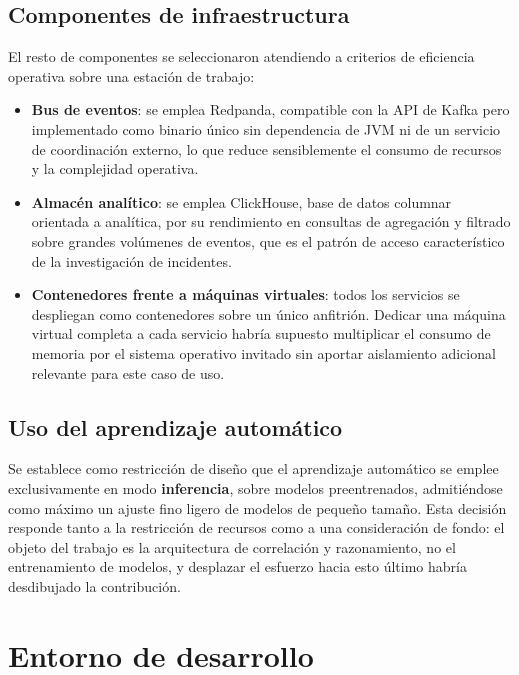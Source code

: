 \subsection{Componentes de infraestructura}

El resto de componentes se seleccionaron atendiendo a criterios de eficiencia operativa
sobre una estación de trabajo:

\begin{itemize}
    \item \textbf{Bus de eventos}: se emplea Redpanda, compatible con la API de Kafka pero
    implementado como binario único sin dependencia de JVM ni de un servicio de coordinación
    externo, lo que reduce sensiblemente el consumo de recursos y la complejidad operativa.
    \item \textbf{Almacén analítico}: se emplea ClickHouse, base de datos columnar orientada
    a analítica, por su rendimiento en consultas de agregación y filtrado sobre grandes
    volúmenes de eventos, que es el patrón de acceso característico de la investigación de
    incidentes.
    \item \textbf{Contenedores frente a máquinas virtuales}: todos los servicios se despliegan
    como contenedores sobre un único anfitrión. Dedicar una máquina virtual completa a cada
    servicio habría supuesto multiplicar el consumo de memoria por el sistema operativo
    invitado sin aportar aislamiento adicional relevante para este caso de uso.
\end{itemize}

\subsection{Uso del aprendizaje automático}

Se establece como restricción de diseño que el aprendizaje automático se emplee
exclusivamente en modo \textbf{inferencia}, sobre modelos preentrenados, admitiéndose como
máximo un ajuste fino ligero de modelos de pequeño tamaño. Esta decisión responde tanto a la
restricción de recursos como a una consideración de fondo: el objeto del trabajo es la
arquitectura de correlación y razonamiento, no el entrenamiento de modelos, y desplazar el
esfuerzo hacia esto último habría desdibujado la contribución.

\section{Entorno de desarrollo}

